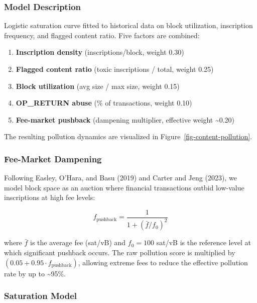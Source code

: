 \documentclass[
  11pt,
]{article}
\providecommand{\tightlist}{%
  \setlength{\itemsep}{0pt}\setlength{\parskip}{0pt}}\usepackage{longtable,booktabs,array}
\begin{document}
\hypertarget{model-description-1}{%
\subsubsection{Model Description}\label{model-description-1}}

Logistic saturation curve fitted to historical data on block
utilization, inscription frequency, and flagged content ratio. Five
factors are combined:

\begin{enumerate}
\def\labelenumi{\arabic{enumi}.}
\tightlist
\item
  \textbf{Inscription density} (inscriptions/block, weight 0.30)
\item
  \textbf{Flagged content ratio} (toxic inscriptions / total, weight
  0.25)
\item
  \textbf{Block utilization} (avg size / max size, weight 0.15)
\item
  \textbf{OP\_RETURN abuse} (\% of transactions, weight 0.10)
\item
  \textbf{Fee-market pushback} (dampening multiplier, effective weight
  \textasciitilde0.20)
\end{enumerate}

The resulting pollution dynamics are visualized in
Figure~\ref{fig-content-pollution}.

\hypertarget{fee-market-dampening}{%
\subsubsection{Fee-Market Dampening}\label{fee-market-dampening}}

Following Easley, O'Hara, and Basu (2019) and Carter and Jeng (2023), we
model block space as an auction where financial transactions outbid
low-value inscriptions at high fee levels:

\[f_{\text{pushback}} = \frac{1}{1 + (\bar{f} / f_0)^2}\]

where \(\bar{f}\) is the average fee (sat/vB) and \(f_0 = 100\) sat/vB
is the reference level at which significant pushback occurs. The raw
pollution score is multiplied by
\((0.05 + 0.95 \cdot f_{\text{pushback}})\), allowing extreme fees to
reduce the effective pollution rate by up to \textasciitilde95\%.

\hypertarget{saturation-model}{%
\subsubsection{Saturation Model}\label{saturation-model}}
\end{document}
